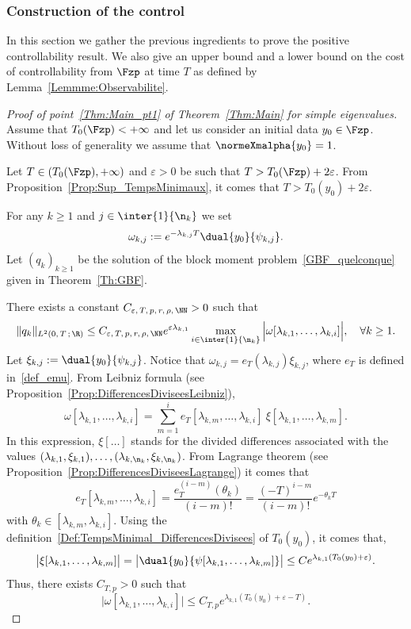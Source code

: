 \subsubsection{Construction of the control} \label{Subsec:ConstructionControle}
In this section we gather the previous ingredients to prove the positive controllability result. We also give an upper bound and a lower bound on the cost of controllability from $\Fzp$ at time $T$ as defined by Lemma~\ref{Lemmme:Observabilite}.
\begin{proof}[Proof of point~\eqref{Thm:Main_pt1} of Theorem~\ref{Thm:Main} for simple eigenvalues]
Assume that $T_0(\Fzp)\linebreak <+\infty$ and let us consider an initial data $y_0\in \Fzp$. Without loss of generality we assume that $\normeXmalpha{y_0}=1$.

Let $T\in (T_0(\Fzp), +\infty)$ and $\varepsilon >0$ be such that $T> T_0(\Fzp) + 2\varepsilon$. From Proposition~\ref{Prop:Sup_TempsMinimaux}, it comes that $T> T_0(y_0) + 2\varepsilon$.

For any $k \geq 1$ and $j \in \inter{1}{\n_k}$ we set
\[
\omega_{k,j} := e^{-\lambda_{k,j} T} \dual{y_0}{\psi_{k,j}}.
\]
Let $(q_k)_{k \geq 1}$ be the solution of the block moment problem~\eqref{GBF_quelconque} given in Theorem~\ref{Th:GBF}.

There exists a constant $C_{\varepsilon,\,T,\, p,\, r,\, \rho,\, \NN} >0$ such that
\[
\| q_k \|_{L^2(0,\,T\,;\,\R)} \leq C_{\varepsilon,\,T,\,p,\,r,\,\rho,\,\NN} e^{\varepsilon \lambda_{k,1} }
\max \limits_{i\in \inter{1}{\n_k}} \Big| \omega[\lambda_{k,1}, \dots, \lambda_{k,i}] \Big|, \quad \forall k \geq 1.
\]
Let $\xi_{k,j} := \dual{y_0}{\psi_{k,j}}$. Notice that $\omega_{k,j} = e_T(\lambda_{k,j}) \xi_{k,j}$, where $e_T$ is defined in~\eqref{def_emu}. From Leibniz formula (see Proposition~\ref{Prop:DifferencesDiviseesLeibniz}),
\begin{equation}\label{GBF_Leibniz_omega}
\omega[\lambda_{k,1},\dots,\lambda_{k,i}] = \sum_{m=1}^i e_T[\lambda_{k,m},\dots,\lambda_{k,i}] \: \xi[\lambda_{k,1}, \dots, \lambda_{k,m}].
\end{equation}
In this expression, $\xi[\dots]$ stands for the divided differences associated with the values $(\lambda_{k,1}, \xi_{k,1}), \dots,(\lambda_{k,\n_k},\xi_{k,\n_k})$. From Lagrange theorem (see Proposition~\ref{Prop:DifferencesDiviseesLagrange}) it comes that
\[
e_T[\lambda_{k,m},\dots,\lambda_{k,i}] = \frac{e_T^{(i-m)}(\theta_k)}{(i-m)!} = \frac{(-T)^{i-m}}{(i-m)!} e^{-\theta_k T}
\]
with $\theta_k \in [\lambda_{k,m}, \lambda_{k,i}]$. Using the definition~\eqref{Def:TempsMinimal_DifferencesDivisees} of $T_0(y_0)$, it comes that,
\begin{equation}\label{GBF_Estimee_Xi_kj}
\big| \xi[\lambda_{k,1}, \dots, \lambda_{k,m}] \big| = \big| \dual{y_0}{\psi[\lambda_{k,1}, \dots, \lambda_{k,m}]} \big| \leq C e^{\lambda_{k,1} (T_0(y_0) + \varepsilon)}.
\end{equation}
Thus, there exists $C_{T, p} >0$ such that
\[
\big| \omega[\lambda_{k,1}, \dots, \lambda_{k,i}] \big| \leq C_{T,p} e^{\lambda_{k,1} (T_0(y_0) +\varepsilon - T)}.
\]


\end{proof}
